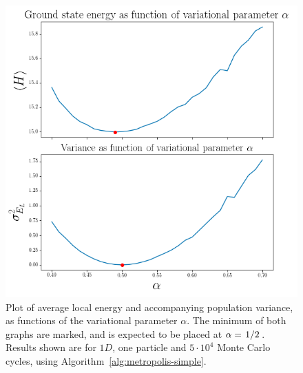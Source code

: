 \documentclass[a4paper, 11pt]{article}
\begin{document}
\begin{figure}[!h]
    \centering
    \includegraphics[width=0.9\linewidth]{../results/var-alpha-plot-noimp-50000.png}
    \caption{Plot of average local energy and accompanying population variance,
    as functions of the variational parameter $\alpha$. The minimum of both
    graphs are marked, and is expected to be placed at
    $\alpha=\flatfrac{1}{2}$. Results shown are for $1D$, one particle and
    $5\cdot 10^{4}$ Monte Carlo cycles, using
    Algorithm~\ref{alg:metropolis-simple}.}
    \label{fig:var-alpha-plot-noimp}
\end{figure}
\end{document}
